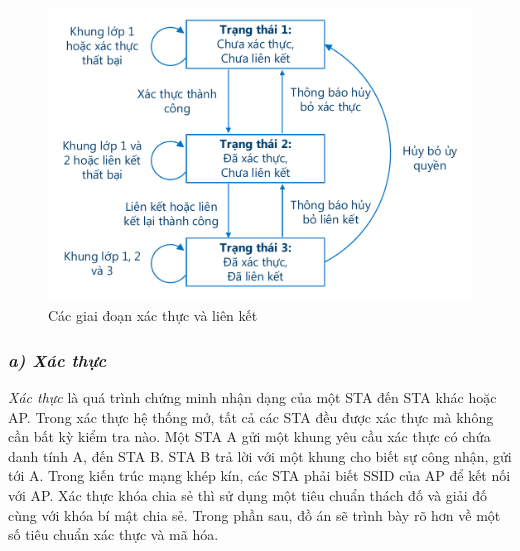 \begin{figure}[H]
    \centering
    \includegraphics[width=1.0\textwidth]{authentication-and-association}
    \caption{
        \label{fig:authentication-and-association}
        Các giai đoạn xác thực và liên kết}%
\end{figure}

\subsubsection*{\textit{a) Xác thực}}
\emph{Xác thực} là quá trình chứng minh nhận dạng của một STA đến STA khác hoặc AP. Trong xác thực hệ thống mở, tất cả các STA đều được xác thực mà không cần bất kỳ kiểm tra nào. Một STA A gửi một khung yêu cầu xác thực có chứa danh tính A, đến STA B. STA B trả lời với một khung cho biết sự công nhận, gửi tới A. Trong kiến trúc mạng khép kín, các STA phải biết SSID của AP để kết nối với AP. Xác thực khóa chia sẻ thì sử dụng một tiêu chuẩn thách đố và giải đố cùng với khóa bí mật chia sẻ. Trong phần sau, đồ án sẽ trình bày rõ hơn về một số tiêu chuẩn xác thực và mã hóa.

